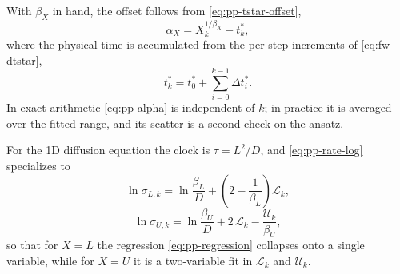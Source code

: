 With $\beta_X$ in hand, the offset follows from \eqref{eq:pp-tstar-offset},
\begin{equation}\label{eq:pp-alpha}
  \alpha_X = X_k^{1/\beta_X} - t_k^*,
\end{equation}
where the physical time is accumulated from the per-step increments of
\eqref{eq:fw-dtstar},
\begin{equation}\label{eq:pp-tstar-cumsum}
  t_k^* = t_0^* + \sum_{i=0}^{k-1} \Delta t_i^* .
\end{equation}
In exact arithmetic \eqref{eq:pp-alpha} is independent of $k$; in practice it
is averaged over the fitted range, and its scatter is a second check on the
ansatz.

For the 1D diffusion equation the clock is $\tau = L^2/D$, and
\eqref{eq:pp-rate-log} specializes to
\begin{equation}\label{eq:pp-1d-sigma-L}
  \ln \sigma_{L,k} = \ln \frac{\beta_L}{D} + \left( 2 - \frac{1}{\beta_L} \right) \mathcal{L}_k,
\end{equation}
\begin{equation}\label{eq:pp-1d-sigma-U}
  \ln \sigma_{U,k} = \ln \frac{\beta_U}{D} + 2\, \mathcal{L}_k - \frac{\mathcal{U}_k}{\beta_U},
\end{equation}
so that for $X = L$ the regression \eqref{eq:pp-regression} collapses onto a
single variable, while for $X = U$ it is a two-variable fit in
$\mathcal{L}_k$ and $\mathcal{U}_k$.
